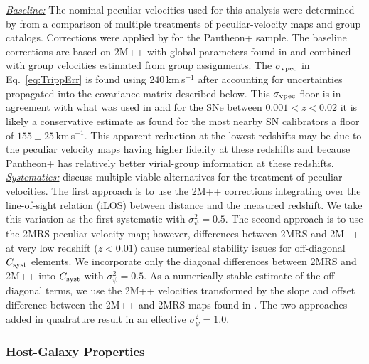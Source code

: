 \documentclass[twocolumn]{aastex63}
\begin{document}
\noindent\uline{\textit{Baseline:}} The nominal peculiar velocities used for this analysis were determined by \cite{peterson21} from a comparison of multiple treatments of peculiar-velocity maps and group catalogs. Corrections were applied by \cite{carr21} for the Pantheon+ sample. The baseline corrections are based on 2M++ \citep{Carrick15} with global parameters found in \cite{said20} and combined with group velocities estimated from \cite{tully15} group assignments. The  $\sigma_{\rm vpec}$ in Eq.~\ref{eq:TrippErr} is found { using} 240\,km\,s$^{-1}$ after accounting for uncertainties propagated into the covariance matrix described below. { This $\sigma_{\rm vpec}$ floor is in agreement with what was used in \cite{peterson21} and for the SNe between $0.001<z<0.02$ it is likely a conservative estimate as \cite{kenworthy22} found for the most nearby SN calibrators a floor of $155\pm25$\,km\,s$^{-1}$. This apparent reduction at the lowest redshifts may be due to the peculiar velocity maps having higher fidelity at these redshifts and because Pantheon+ has relatively better virial-group information at these redshifts.}\\

\noindent\uline{\textit{Systematics:}} 
\cite{peterson21} discuss multiple viable alternatives for the treatment of peculiar velocities.
The first approach is to use the 2M++ corrections \citep{Carrick15} integrating over the line-of-sight relation (iLOS) between distance and the measured redshift. We take this variation as the first systematic with $\sigma_\psi^2=0.5$.
The second approach is to use the 2MRS \citep{lilownusser} peculiar-velocity map; however, differences between 2MRS and 2M++ at very low redshift ($z<0.01$) cause numerical stability issues for off-diagonal $C_{\rm syst}$ elements.
We incorporate only the diagonal differences between 2MRS and 2M++ into $C_{\rm syst}$ with $\sigma_\psi^2=0.5$. As a numerically stable estimate of the off-diagonal terms, we use the 2M++ velocities transformed by the slope and offset difference between the 2M++ and 2MRS maps found in \cite{peterson21}.
The two approaches added in quadrature result in an effective $\sigma_\psi^2=1.0$.





\subsubsection{\textbf{Host-Galaxy Properties}}
\label{subsubsection:hosts}
\end{document}
